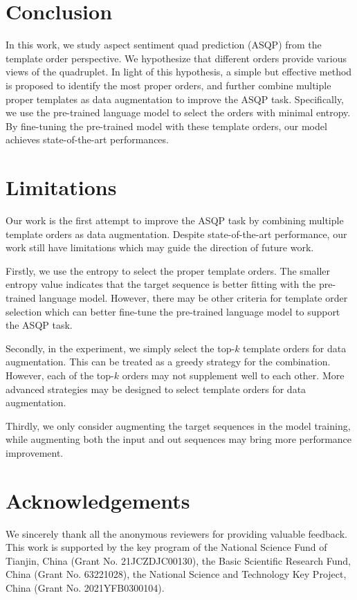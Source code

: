\documentclass[11pt]{article}
\begin{document}
\section{Conclusion}
In this work, we study aspect sentiment quad prediction (ASQP) from the template order perspective. We hypothesize that different orders provide various views of the quadruplet. In light of this hypothesis, a simple but effective method is proposed to identify the most proper orders, and further combine multiple proper templates as data augmentation to improve the ASQP task. Specifically, we use the pre-trained language model to select the orders with minimal entropy. By fine-tuning the pre-trained model with these template orders, our model achieves state-of-the-art performances. 

\section*{Limitations}
Our work is the first attempt to improve the ASQP task by combining multiple template orders as data augmentation. Despite state-of-the-art performance, our work still have limitations which may guide the direction of future work.

Firstly, we use the entropy to select the proper template orders. The smaller entropy value indicates that the target sequence is better fitting with the pre-trained language model. However, there may be other criteria for template order selection which can better fine-tune the pre-trained language model to support the ASQP task. 

Secondly, in the experiment, we simply select the top-$k$ template orders for data augmentation. This can be treated as a greedy strategy for the combination. However, each of the top-$k$ orders may not supplement well to each other. More advanced strategies may be designed to select template orders for data augmentation. 



Thirdly, we only consider augmenting the target sequences in the model training, while augmenting both the input and out sequences may bring more performance improvement.  





\section*{Acknowledgements}
We sincerely thank all the anonymous reviewers for providing valuable feedback. This work is supported by the key program of the National Science Fund of Tianjin, China (Grant No. 21JCZDJC00130), the Basic Scientific Research Fund, China (Grant No. 63221028), the National Science and Technology Key Project, China (Grant No. 2021YFB0300104).
\end{document}
